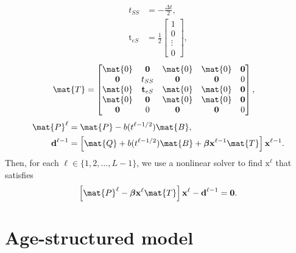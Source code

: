 \documentclass{jpmarticle}
\renewcommand{\vec}[1]{\boldsymbol{\mathrm{#1}}}
\begin{document}
\begin{equation}
  \begin{split}
    t_{SS} &=
    - \frac{\Delta t}{2},
    \\
    \vec{t}_{eS} &=
    \frac{1}{2}
    \begin{bmatrix}
      1 \\ 0 \\ \vdots \\ 0
    \end{bmatrix},
  \end{split}
\end{equation}
\begin{equation}
  \begin{split}
    \mat{T} &=
    \begin{bmatrix}
      \mat{0} & \vec{0} & \mat{0} & \mat{0} & \vec{0}
      \\
      \vec{0} & t_{SS} & \vec{0} & \vec{0} & 0
      \\
      \mat{0} & \vec{t}_{eS} & \mat{0} & \mat{0} & \vec{0}
      \\
      \mat{0} & \vec{0} & \mat{0} & \mat{0} & \vec{0}
      \\
      \vec{0} & 0 & \vec{0} & \vec{0} & 0
    \end{bmatrix},
  \end{split}
\end{equation}
\begin{equation}
  \begin{split}
    \mat{P}^{\ell} &=
    \mat{P} - b(t^{\ell - 1 / 2}) \mat{B},
    \\
    \vec{d}^{\ell - 1} &=
    \left[
      \mat{Q}
      + b(t^{\ell - 1 / 2}) \mat{B}
      + \vec{\beta} \vec{x}^{\ell - 1} \mat{T}
    \right] \vec{x}^{\ell - 1}.
  \end{split}
\end{equation}
Then, for each $\ell \in \{1, 2, \ldots, L - 1\}$,
we use a nonlinear solver to find $\vec{x}^{\ell}$ that satisfies
\begin{equation}
  \left[
    \mat{P}^{\ell}
    - \vec{\beta} \vec{x}^{\ell} \mat{T}
  \right] \vec{x}^{\ell}
  - \vec{d}^{\ell - 1}
  = \vec{0}.
\end{equation}


\section{Age-structured model}
\end{document}

